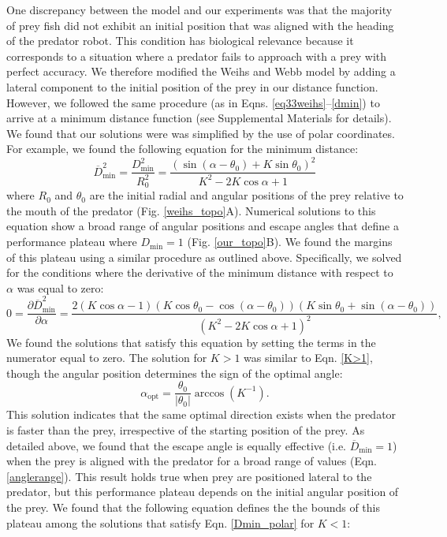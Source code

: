 \documentclass[12pt]{article}
\def\ds{\displaystyle}
\def\d{\partial}
\newcommand{\ol}{\overline}
\begin{document}
One discrepancy between the model and our experiments was that the majority of prey fish did not exhibit an initial position that was aligned with the heading of the predator robot. This condition has biological relevance because it corresponds to a situation where a predator fails to approach with a prey with perfect accuracy. We therefore modified the Weihs and Webb model by adding a lateral component to the initial position of the prey in our distance function. However, we followed the same procedure (as in Eqns. \ref{eq33weihs}--\ref{dmin}) to arrive at a minimum distance function (see Supplemental Materials for details). We found that our solutions were was simplified by the use of polar coordinates. For example, we found the following equation for the minimum distance:
%
\begin{equation}
\ol{D}^2_{\text{min}}= \ds\frac{{D}^2_{\text{min}}}{R_0^2 }=
\ds\frac{\left ( \sin(\alpha - \theta_0) + K \sin \theta_0 \right )^2}{K^2-2 K \cos \alpha +1} 
\label{Dmin_polar}
\end{equation}
%
where $R_0$ and $\theta_0$ are the initial radial and angular positions of the prey relative to the mouth of the predator (Fig. \ref{weihs_topo}A). Numerical solutions to this equation show a broad range of angular positions and escape angles that define a performance plateau where $D_{\text{min}}=1$ (Fig. \ref{our_topo}B). We found the margins of this plateau using a similar procedure as outlined above. Specifically, we solved for the conditions where the derivative of the minimum distance with respect to $\alpha$ was equal to zero:
%
\begin{equation}
0 = \frac{\d \ol{D}^2_{\text{min}}}{\d \alpha} = 
\frac{2(K \cos \alpha - 1)(K\cos \theta_0 - \cos(\alpha - \theta_0))(K\sin \theta_0 + \sin(\alpha -\theta_0))}
{(K^2 - 2K \cos \alpha + 1)^2},
\label{DminDalpha}
\end{equation} 
%
We found the solutions that satisfy this equation by setting the terms in the numerator equal to zero. The solution for $K>1$ was similar to Eqn. \ref{K>1}, though the angular position determines the sign of the optimal angle: 
%
\begin{equation}
\alpha_{\text{opt}} = \frac{\theta_0}{|\theta_0|}  \arccos(K^{-1}).
\label{DminDalpha}
\end{equation} 
%
This solution indicates that the same optimal direction exists when the predator is faster than the prey, irrespective of the starting position of the prey. As detailed above, we found that the escape angle is equally effective (i.e. $\ol D_{\text{min}}=1$) when the prey is aligned with the predator for a broad range of values (Eqn. \ref{anglerange}). This result holds true when prey are positioned lateral to the predator, but this performance plateau depends on the initial angular position of the prey. We found that the following equation defines the  the bounds of this plateau among the solutions that satisfy Eqn. \ref{Dmin_polar} for $K<1$:
\end{document}
